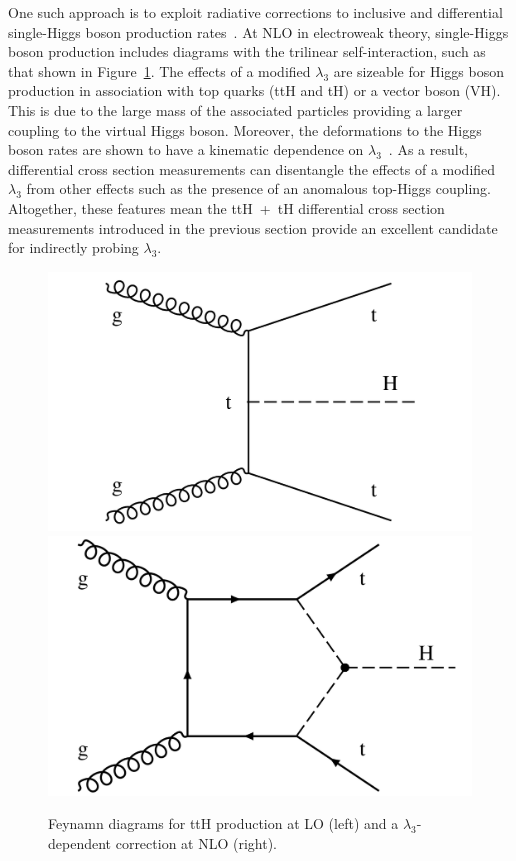 One such approach is to exploit radiative corrections to inclusive and differential single-Higgs boson production rates~\cite{Degrassi:2016wml,Maltoni:2017ims,Gorbahn:2016uoy,Bizon:2016wgr,DiVita:2017eyz}. At NLO in electroweak theory, single-Higgs boson production includes diagrams with the trilinear self-interaction, such as that shown in Figure~\ref{fig:trilinear_feynman}. The effects of a modified $\lambda_3$ are sizeable for Higgs boson production in association with top quarks (ttH and tH) or a vector boson (VH). This is due to the large mass of the associated particles providing a larger coupling to the virtual Higgs boson. Moreover, the deformations to the Higgs boson rates are shown to have a kinematic dependence on $\lambda_3$~\cite{Maltoni:2017ims,DiVita:2017eyz}. As a result, differential cross section measurements can disentangle the effects of a modified $\lambda_3$ from other effects such as the presence of an anomalous top-Higgs coupling. Altogether, these features mean the ttH~+~tH differential cross section measurements introduced in the previous section provide an excellent candidate for indirectly probing $\lambda_3$.

\begin{figure}[htb!]
  \centering
  \includegraphics[width=.35\textwidth]{Figures/cms/trilinear/CMS-PAS-HIG-19-005_Figure_001-d.pdf}
  \includegraphics[width=.35\textwidth]{Figures/cms/trilinear/CMS-PAS-FTR-18-020_Figure_001.pdf}
  \caption[Feynam diagram showing a $\lambda_3$-dependent NLO correction to ttH production.]
  {
    Feynamn diagrams for ttH production at LO (left) and a $\lambda_3$-dependent correction at NLO (right).
  }
  \label{fig:trilinear_feynman}
\end{figure}

